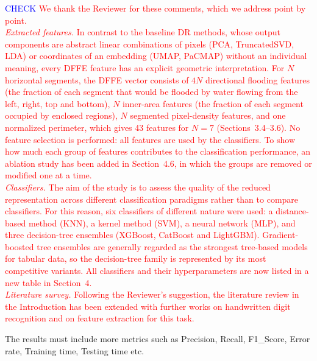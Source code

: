 \documentclass{ar2rc}
\begin{document}
\AR
\textcolor{blue}{CHECK} \textcolor{red}{We thank the Reviewer for these comments, which we address point by point. \\
\textit{Extracted features.} In contrast to the baseline DR methods, whose output components are abstract linear combinations of pixels (PCA, TruncatedSVD, LDA) or coordinates of an embedding (UMAP, PaCMAP) without an individual meaning, every DFFE feature has an explicit geometric interpretation. For $N$ horizontal segments, the DFFE vector consists of $4N$ directional flooding features (the fraction of each segment that would be flooded by water flowing from the left, right, top and bottom), $N$ inner-area features (the fraction of each segment occupied by enclosed regions), $N$ segmented pixel-density features, and one normalized perimeter, which gives 43 features for $N = 7$ (Sections~3.4--3.6). No feature selection is performed: all features are used by the classifiers. To show how much each group of features contributes to the classification performance, an ablation study has been added in Section~4.6, in which the groups are removed or modified one at a time. \\
\textit{Classifiers.} The aim of the study is to assess the quality of the reduced representation across different classification paradigms rather than to compare classifiers. For this reason, six classifiers of different nature were used: a distance-based method (KNN), a kernel method (SVM), a neural network (MLP), and three decision-tree ensembles (XGBoost, CatBoost and LightGBM). Gradient-boosted tree ensembles are generally regarded as the strongest tree-based models for tabular data, so the decision-tree family is represented by its most competitive variants. All classifiers and their hyperparameters are now listed in a new table in Section~4. \\
\textit{Literature survey.} Following the Reviewer's suggestion, the literature review in the Introduction has been extended with further works on handwritten digit recognition and on feature extraction for this task.}

\RC %
The results must include more metrics such as Precision, Recall, F1\_Score, Error rate, Training time, Testing time etc.
\end{document}
